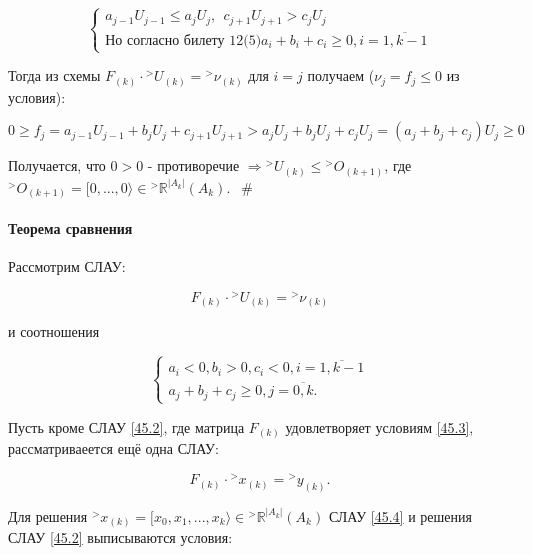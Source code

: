 \documentclass[__main__.tex]{subfiles}
\begin{document}
\begin{equation}\label{45.1}
\begin{cases}
a_{j-1} U_{j-1} \leq a_j U_j, \ \ c_{j+1} U_{j+1} > c_j U_j \\
\text{Но согласно билету 12(5)} a_i+b_i+c_i \geq 0, i = \overline{1,k-1}
\end{cases}
\end{equation}

Тогда из схемы $F_{\left(k\right)} \cdot {}^>U_{\left(k\right)} = {}^>\nu_{\left(k\right)}$ для $i=j$ получаем ($\nu_j = f_j \leq 0$ из условия):

$$
0 \geq f_j = a_{j-1} U_{j-1} + b_j U_j + c_{j+1} U_{j+1} > a_j U_j + b_j U_j + c_j U_j = \left(a_j + b_j + c_j\right) U_j \geq 0
$$

Получается, что $0>0$ - противоречие $\Rightarrow {}^> U_\left(k\right) \leq {}^> O_{\left(k+1\right)}$, где ${}^> O_{\left(k+1\right)} = [0,...,0 \rangle \in {}^> \mathbb{R}^{\left|A_k\right|}\left(A_k\right)$. $ \ \ \#$

\paragraph{Теорема сравнения}

Рассмотрим СЛАУ:

\begin{equation} \label{45.2}
F_{\left(k\right)} \cdot {}^> U_{\left(k\right)} = {}^> \nu_{\left(k\right)}
\end{equation}

и соотношения

\begin{equation} \label{45.3}
\begin{cases}
a_i < 0, b_i > 0, c_i < 0, i = \overline{1,k-1} \\
a_j+b_j+c_j \geq 0, j =\overline{0,k}.
\end{cases}
\end{equation}

Пусть кроме СЛАУ \ref{45.2}, где матрица $F_{\left(k\right)}$ удовлетворяет условиям \ref{45.3}, рассматриваеется ещё одна СЛАУ:

\begin{equation}\label{45.4}
F_{\left(k\right)} \cdot {}^> x_{\left(k\right)} = {}^> y_{\left(k\right)}.
\end{equation}

Для решения ${}^> x_{\left(k\right)} = [x_0, x_1, ..., x_k\rangle \in {}^> \mathbb{R}^{\left|A_k\right|} \left(A_k\right)$ СЛАУ \ref{45.4} и решения СЛАУ \ref{45.2} выписываются условия:
\end{document}
